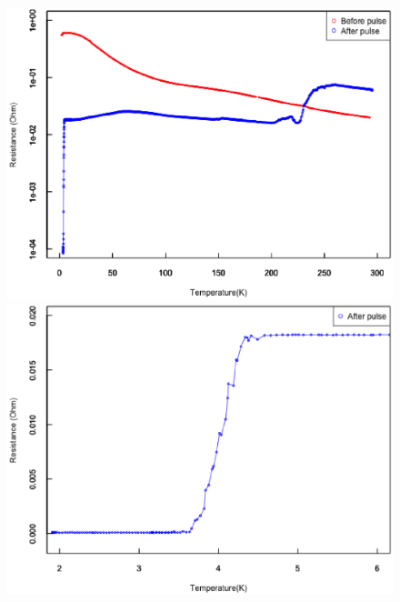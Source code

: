 \begin{figure}[!h]
 \begin{minipage}{\hsize}
    \begin{center}
   \includegraphics[width=\hsize]{results_discussions/181228_before_after_pulse_log.eps}
  \end{center}
  \caption{}
  \label{fig:181228_before_after_pulse_log}
   \end{minipage}
 \begin{minipage}{0.5\hsize}
    \begin{center}
   \includegraphics[width=\hsize]{results_discussions/181228_after_pulse.eps}
  \end{center}
  \caption{}
  \label{fig:181228_after_pulse}

\end{minipage}
\end{figure}

